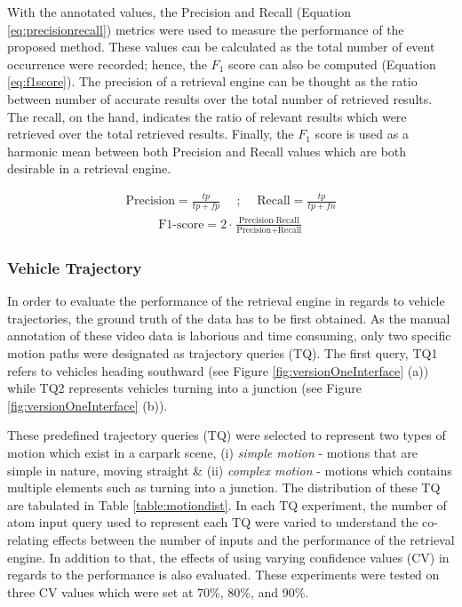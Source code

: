 With the annotated values, the Precision and Recall (Equation \ref{eq:precisionrecall}) metrics were used to measure the performance of the proposed method. These values can be calculated as the total number of event occurrence were recorded; hence, the $F_1$ score can also be computed (Equation \ref{eq:f1score}). The precision of a retrieval engine can be thought as the ratio between number of accurate results over the total number of retrieved results. The recall, on the hand, indicates the ratio of relevant results which were retrieved over the total retrieved results. Finally, the $F_1$ score is used as a harmonic mean between both Precision and Recall values which are both desirable in a retrieval engine.

\begin{align}
\label{eq:precisionrecall}
    \text{Precision} = \frac{tp}{tp + fp}   \hspace{1em} \text{ ; }  \hspace{1em} \text{Recall}  = \frac{tp}{tp + fn}
\end{align}
\begin{align}
\label{eq:f1score}
\text{F1-score}  = 2\cdot\frac{\text{Precision} \cdot \text{Recall}}{\text{Precision} + \text{Recall}}
\end{align}



\subsubsection{Vehicle Trajectory}

In order to evaluate the performance of the retrieval engine in regards to vehicle trajectories, the ground truth of the data has to be first obtained. As the manual annotation of these video data is laborious and time consuming, only two specific motion paths were designated as trajectory queries (TQ). The first query, TQ1 refers to vehicles heading southward (see Figure \ref{fig:versionOneInterface} (a)) while TQ2 represents vehicles turning into a junction (see Figure \ref{fig:versionOneInterface} (b)). 

These predefined trajectory queries (TQ) were selected to represent two types of motion which exist in a carpark scene, (i) \textit{simple motion} - motions that are simple in nature, moving straight \& (ii) \textit{complex motion} - motions which contains multiple elements such as turning into a junction. The distribution of these TQ are tabulated in Table \ref{table:motiondist}. In each TQ experiment, the number of atom input query used to represent each TQ were varied to understand the co-relating effects between the number of inputs and the performance of the retrieval engine. In addition to that, the effects of using varying confidence values (CV) in regards to the performance is also evaluated. These experiments were tested on three CV values which were set at 70\%, 80\%, and 90\%.


